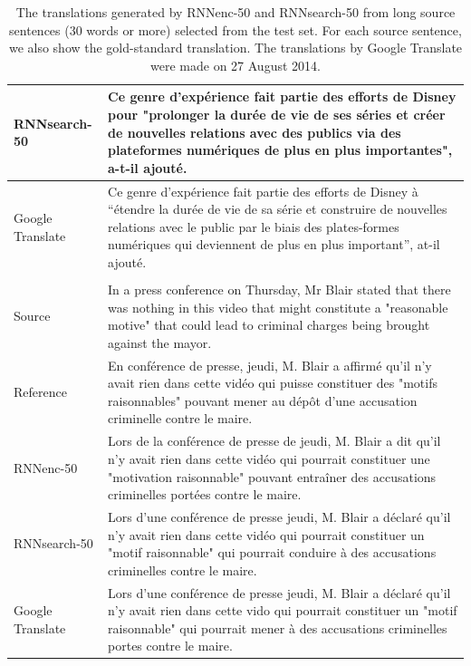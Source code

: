\documentclass{article}
\begin{document}
\begin{table}[htp]
\begin{minipage}{0.99\textwidth}
\begin{tabular}{p{1.9cm} | p{12cm}}
\hline RNNsearch-50 & Ce genre d'exp\'erience fait partie des efforts de Disney pour "prolonger la dur\'ee de vie de ses s\'eries et cr\'eer de nouvelles relations avec des publics via des plateformes num\'eriques de plus en plus importantes", a-t-il ajout\'e.
\\
\hline Google \mbox{Translate} & Ce genre d'exp\'erience fait partie des efforts de Disney
à ``\'etendre la dur\'ee de vie de sa s\'erie et construire de nouvelles relations avec
le public par le biais des plates-formes num\'eriques qui deviennent de plus en
plus important'', at-il ajout\'e.
\\
\hline
\multicolumn{2}{c}{} \\
\hline Source & 
In a press conference on Thursday, Mr Blair stated that there was nothing in
this video that might constitute a "reasonable motive" that could lead to
criminal charges being brought against the mayor.
\\
\hline Reference & En conf\'erence de presse, jeudi, M. Blair a affirm\'e qu'il n'y avait rien dans cette vid\'eo qui puisse constituer des "motifs raisonnables" pouvant mener au d\'ep\^ot d'une accusation criminelle contre le maire.
\\
\hline RNNenc-50 & Lors de la conf\'erence de presse de jeudi, M. Blair a dit qu'il n'y avait rien dans cette vid\'eo qui pourrait constituer une "motivation raisonnable" pouvant entraîner des accusations criminelles port\'ees contre le maire.
\\
\hline RNNsearch-50 & Lors d'une conf\'erence de presse jeudi, M. Blair a d\'eclar\'e qu'il n'y avait rien dans cette vid\'eo qui pourrait constituer un "motif raisonnable" qui pourrait conduire à des accusations criminelles contre le maire.
\\
\hline Google \mbox{Translate} & 
Lors d'une conf\'erence de presse jeudi, M. Blair a d\'eclar\'e qu'il n'y avait rien
dans cette vido qui pourrait constituer un "motif raisonnable" qui pourrait
mener à des accusations criminelles portes contre le maire.
\\
\hline
        \end{tabular}
    \end{minipage}
    \caption{The translations generated by RNNenc-50 and RNNsearch-50 from long
        source sentences (30 words or more) selected from the test set. For each
        source sentence, we also show the gold-standard translation.  The
        translations by Google Translate were made on 27 August 2014.
}

\label{tab:translations}
\end{table}
\end{document}
